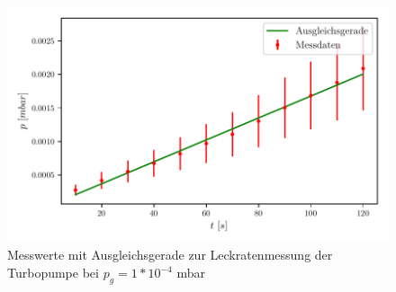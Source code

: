   \begin{figure}[H]
    \centering
    \includegraphics{build/plots/leck_turbo_0.0001.pdf}
    \caption{Messwerte mit Ausgleichsgerade zur Leckratenmessung der Turbopumpe bei $p_g = 1*10^{-4}$ mbar}
    \label{fig:plott1}
  \end{figure}

